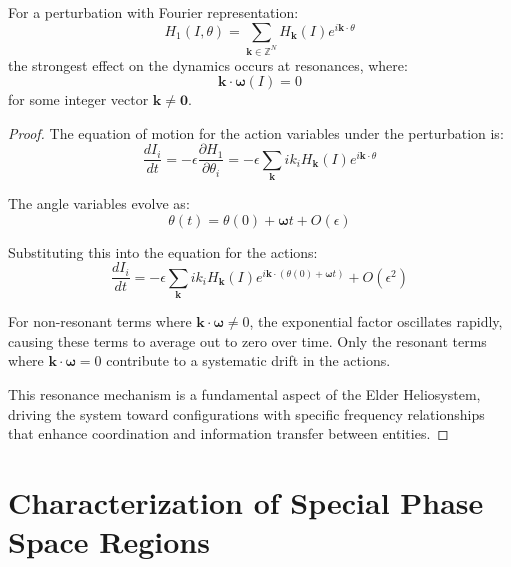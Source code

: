 \begin{theorem}
For a perturbation with Fourier representation:
\begin{equation}
H_1(I, \theta) = \sum_{\mathbf{k} \in \mathbb{Z}^N} H_{\mathbf{k}}(I) e^{i\mathbf{k} \cdot \theta}
\end{equation}
the strongest effect on the dynamics occurs at resonances, where:
\begin{equation}
\mathbf{k} \cdot \boldsymbol{\omega}(I) = 0
\end{equation}
for some integer vector $\mathbf{k} \neq \mathbf{0}$.
\end{theorem}

\begin{proof}
The equation of motion for the action variables under the perturbation is:
\begin{equation}
\frac{dI_i}{dt} = -\epsilon \frac{\partial H_1}{\partial \theta_i} = -\epsilon \sum_{\mathbf{k}} ik_i H_{\mathbf{k}}(I) e^{i\mathbf{k} \cdot \theta}
\end{equation}

The angle variables evolve as:
\begin{equation}
\theta(t) = \theta(0) + \boldsymbol{\omega}t + O(\epsilon)
\end{equation}

Substituting this into the equation for the actions:
\begin{equation}
\frac{dI_i}{dt} = -\epsilon \sum_{\mathbf{k}} ik_i H_{\mathbf{k}}(I) e^{i\mathbf{k} \cdot (\theta(0) + \boldsymbol{\omega}t)} + O(\epsilon^2)
\end{equation}

For non-resonant terms where $\mathbf{k} \cdot \boldsymbol{\omega} \neq 0$, the exponential factor oscillates rapidly, causing these terms to average out to zero over time. Only the resonant terms where $\mathbf{k} \cdot \boldsymbol{\omega} = 0$ contribute to a systematic drift in the actions.

This resonance mechanism is a fundamental aspect of the Elder Heliosystem, driving the system toward configurations with specific frequency relationships that enhance coordination and information transfer between entities.
\end{proof}

\section{Characterization of Special Phase Space Regions}

